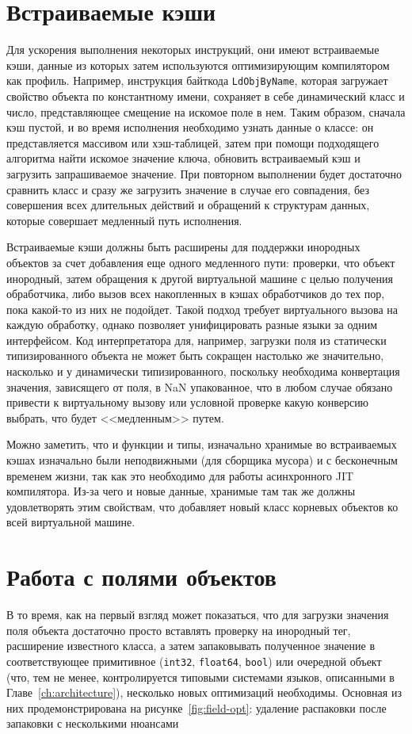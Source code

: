 \documentclass[times
]{itmo-student-thesis}
\begin{document}
\section{Встраиваемые кэши}
Для ускорения выполнения некоторых инструкций, они имеют встраиваемые кэши, данные из которых затем используются оптимизирующим компилятором как профиль. Например, инструкция байткода \texttt{LdObjByName}, которая загружает свойство объекта по константному имени, сохраняет в себе динамический класс и число, представляющее смещение на искомое поле в нем. Таким образом, сначала кэш пустой, и во время исполнения необходимо узнать данные о классе: он представляется массивом или хэш-таблицей, затем при помощи подходящего алгоритма найти искомое значение ключа, обновить встраиваемый кэш и загрузить запрашиваемое значение. При повторном выполнении будет достаточно сравнить класс и сразу же загрузить значение в случае его совпадения, без совершения всех длительных действий и обращений к структурам данных, которые совершает медленный путь исполнения.

Встраиваемые кэши должны быть расширены для поддержки инородных объектов за счет добавления еще одного медленного пути: проверки, что объект инородный, затем обращения к другой виртуальной машине с целью получения обработчика, либо вызов всех накопленных в кэшах обработчиков до тех пор, пока какой-то из них не подойдет. Такой подход требует виртуального вызова на каждую обработку, однако позволяет унифицировать разные языки за одним интерфейсом. Код интерпретатора для, например, загрузки поля из статически типизированного объекта не может быть сокращен настолько же значительно, насколько и у динамически типизированного, поскольку необходима конвертация значения, зависящего от поля, в NaN упакованное, что в любом случае обязано привести к виртуальному вызову или условной проверке какую конверсию выбрать, что будет <<медленным>> путем.

Можно заметить, что и функции и типы, изначально хранимые во встраиваемых кэшах изначально были неподвижными (для сборщика мусора) и с бесконечным временем жизни, так как это необходимо для работы асинхронного JIT компилятора. Из-за чего и новые данные, хранимые там так же должны удовлетворять этим свойствам, что добавляет новый класс корневых объектов ко всей виртуальной машине.

\section{Работа с полями объектов}\label{ch:work-with-fields}
В то время, как на первый взгляд может показаться, что для загрузки значения поля объекта достаточно просто вставлять проверку на инородный тег, расширение известного класса, а затем запаковывать полученное значение в соответствующее примитивное (\texttt{int32}, \texttt{float64}, \texttt{bool}) или очередной объект (что, тем не менее, контролируется типовыми системами языков, описанными в Главе~\ref{ch:architecture}), несколько новых оптимизаций необходимы. Основная из них продемонстрирована на рисунке~\ref{fig:field-opt}: удаление распаковки после запаковки с несколькими нюансами
\end{document}
